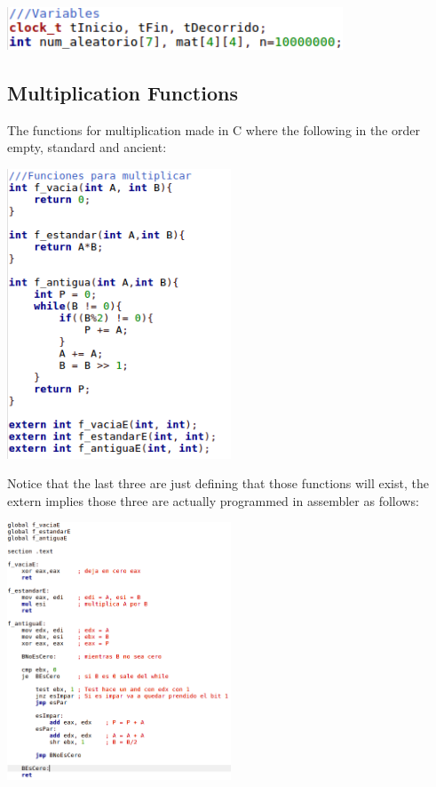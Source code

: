 \documentclass[legalpaper,12pt]{article}
\begin{document}
\begin{center}{\includegraphics[width=0.75\textwidth]{Variables.png}\\[1cm]}\end{center}


\subsection{Multiplication Functions}
The functions for multiplication made in C where the following in the order empty, standard and ancient:
    
\begin{center}{\includegraphics[width=0.5\textwidth]{funcionesC.png}\\[1cm]}\end{center}

\justifying
Notice that the last three are just defining that those functions will exist, the extern implies those three are actually programmed in assembler as follows:

\begin{center}{\includegraphics[width=0.5\textwidth]{funcionesNASM.png}\\[1cm]}\end{center}
\end{document}

